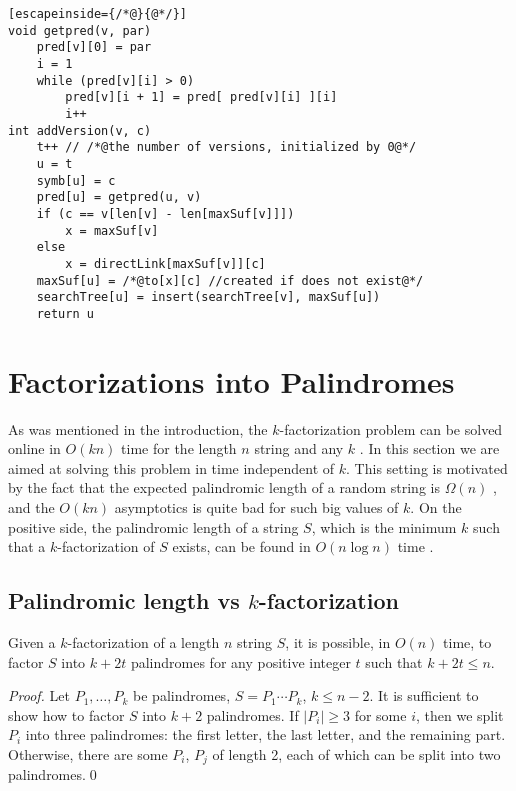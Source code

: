 \documentclass{llncs}
\begin{document}
\begin{lstlisting}[escapeinside={/*@}{@*/}]
void getpred(v, par)
	pred[v][0] = par
	i = 1
	while (pred[v][i] > 0)
		pred[v][i + 1] = pred[ pred[v][i] ][i]
		i++
int addVersion(v, c)
	t++ // /*@the number of versions, initialized by 0@*/
	u = t	
	symb[u] = c
	pred[u] = getpred(u, v)
	if (c == v[len[v] - len[maxSuf[v]]])
		x = maxSuf[v] 
	else 
		x = directLink[maxSuf[v]][c]
	maxSuf[u] = /*@to[x][c] //created if does not exist@*/
	searchTree[u] = insert(searchTree[v], maxSuf[u])
	return u
\end{lstlisting}



\section{Factorizations into Palindromes}\label{splittingSection}

As was mentioned in the introduction, the $k$-factorization problem can be solved online in $O(kn)$ time for the length $n$ string and any $k$ \cite{KRS15}. In this section we are aimed at solving this problem in time independent of $k$. This setting is motivated by the fact that the expected palindromic length of a random string is $\Omega(n)$ \cite{Rav03}, and the $O(kn)$ asymptotics is quite bad for such big values of $k$. On the positive side, the palindromic length of a string $S$, which is the minimum $k$ such that a $k$-factorization of $S$ exists, can be found in $O(n\log n)$ time \cite{FGKK14}. 



\subsection{Palindromic length vs $k$-factorization}

\begin{lemma} \label{kplus2}
Given a $k$-factorization of a length $n$ string $S$, it is possible, in $O(n)$ time, to factor $S$ into $k{+}2t$ palindromes for any positive integer $t$ such that $k{+}2t\le n$.
\end{lemma}

\begin{proof}
Let $P_1,\ldots,P_k$ be palindromes, $S=P_1\cdots P_k$, $k\le n-2$. It is sufficient to show how to factor $S$ into $k{+}2$ palindromes. If $|P_i|\ge 3$ for some $i$, then we split $P_i$ into three palindromes: the first letter, the last letter, and the remaining part. Otherwise, there are some $P_i$, $P_j$ of length 2, each of which can be split into two palindromes.\qed
\end{proof}
\end{document}
